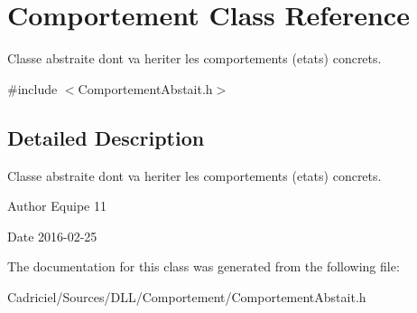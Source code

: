 \hypertarget{class_comportement}{}\section{Comportement Class Reference}
\label{class_comportement}


Classe abstraite dont va heriter les comportements (etats) concrets.  




{\ttfamily \#include $<$Comportement\+Abstait.\+h$>$}



\subsection{Detailed Description}
Classe abstraite dont va heriter les comportements (etats) concrets. 

\begin{DoxyAuthor}{Author}
Equipe 11 
\end{DoxyAuthor}
\begin{DoxyDate}{Date}
2016-\/02-\/25 
\end{DoxyDate}


The documentation for this class was generated from the following file\+:\begin{DoxyCompactItemize}
\item 
Cadriciel/\+Sources/\+D\+L\+L/\+Comportement/Comportement\+Abstait.\+h\end{DoxyCompactItemize}
